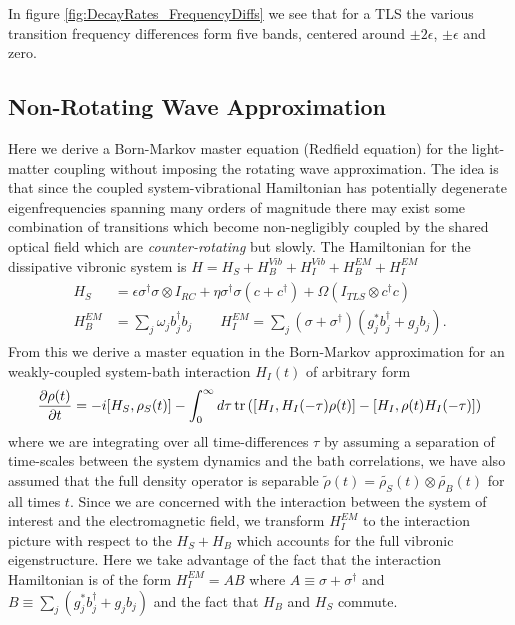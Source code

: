 \documentclass[]{article}
\begin{document}
\begin{itemize}
\begin{itemize}
In figure \ref{fig:DecayRates_FrequencyDiffs} we see that for a TLS the various transition frequency differences form five bands, centered around $\pm2\epsilon$, $\pm\epsilon$ and zero.
\subsection{Non-Rotating Wave Approximation}
\label{ssec:nrwa}
Here we derive a Born-Markov master equation (Redfield equation) for the light-matter coupling without imposing the rotating wave approximation. The idea is that since the coupled system-vibrational Hamiltonian has potentially degenerate eigenfrequencies spanning many orders of magnitude there may exist some combination of transitions which become non-negligibly coupled by the shared optical field which are \textit{counter-rotating} but slowly. The Hamiltonian for the dissipative vibronic system is $H = H_S + H_B^{Vib} + H_I^{Vib} + H_B^{EM} + H_I^{EM}$
\begin{align}
\label{eq:H_nrwa}
	\begin{split}
		H_S &= \epsilon \sigma^{\dagger}\sigma\otimes I_{RC} + \eta\sigma^{\dagger}\sigma(c + c^{\dagger}) + \Omega ( I_{TLS}\otimes c^{\dagger}c) \\
		H_B^{EM} &= \sum_{j}\omega_j b^{\dagger}_j b_j \quad \quad H_I^{EM} = \sum_{j}(\sigma+\sigma^{\dagger})(g_j^*b^{\dagger}_j+ g_j b_j).
	\end{split}
\end{align}
From this we derive a master equation in the Born-Markov approximation for an weakly-coupled system-bath interaction $H_I(t)$ of arbitrary form
\begin{equation}
\pdv{\rho(t)}{t} = -i[H_S, \rho_S(t)] -\int_{0}^{\infty}d\tau\tr\left(\left[H_I, H_I(-\tau)\rho(t)\right] - \left[H_I, \rho(t)H_I(-\tau)\right]\right)
\end{equation}
where we are integrating over all time-differences $\tau$ by assuming a separation of time-scales between the system dynamics and the bath correlations, we have also assumed that the full density operator is separable $\tilde{\rho}(t) = \tilde{\rho_S}(t)\otimes\tilde{\rho_B}(t)$ for all times $t$. Since we are concerned with the interaction between the system of interest and the electromagnetic field, we transform $H_I^{EM}$ to the interaction picture with respect to the $H_S + H_B$ which accounts for the full vibronic eigenstructure. Here we take advantage of the fact that the interaction Hamiltonian is of the form $H_I^{EM}=AB$ where $A \equiv \sigma + \sigma^{\dagger}$ and $B\equiv \sum_{j}(g_j^*b^{\dagger}_j+ g_j b_j)$ and the fact that $H_B$ and $H_S$ commute.

\end{itemize}
\end{itemize}
\end{document}
